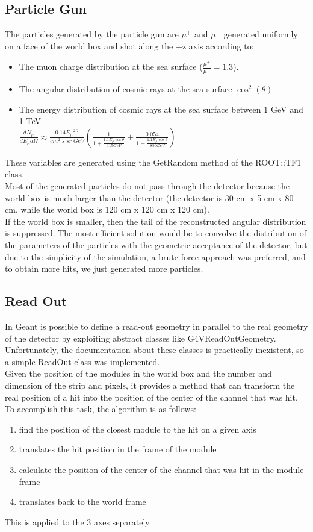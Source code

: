 \documentclass[10pt, a4paper, twocolumn]{article} %
\begin{document}
\subsection{Particle Gun}
\label{ssec:PG}
The particles generated by the particle gun are $\mu^+$ and $\mu^-$ generated uniformly on a face of the world box and shot along the +z axis according to:
\begin{itemize} 
    \item The muon charge distribution at the sea surface ($\frac{\mu^+}{\mu^-}=1.3$).
    \item The angular distribution of cosmic rays at the sea surface $\cos^2(\theta)$
    \item The energy distribution of cosmic rays at the sea surface between 1 GeV and 1 TeV
    \\
    $ \frac{dN_{\mu}}{dE_{\mu} d \Omega} \approx \frac{0.14 E_{\mu}^{-2.7}}{cm^2 \; s \;sr \; GeV} \left( \frac{1}{1+\frac{1.1 E_{\mu}\cos{\theta}}{115 GeV}} + \frac{0.054}{1+\frac{1.1 E_{\mu}\cos{\theta}}{850 GeV}} \right) $
\end{itemize}
These variables are generated using the GetRandom method of the ROOT::TF1 class.
\\
Most of the generated particles do not pass through the detector because the world box is much larger than the detector (the detector is 30 cm x 5 cm x 80 cm, while the world box is 120 cm x 120 cm x 120 cm).
\\
If the world box is smaller, then the tail of the reconstructed angular distribution is suppressed.
The most efficient solution would be to convolve the distribution of the parameters of the particles with the geometric acceptance of the detector, but due to the simplicity of the simulation, a brute force approach was preferred, and to obtain more hits, we just generated more particles.
\subsection{Read Out}
In Geant is possible to define a read-out geometry in parallel to the real geometry of the detector by exploiting abstract classes like G4VReadOutGeometry. Unfortunately, the documentation about these classes is practically inexistent, so a simple ReadOut class was implemented.
\\
Given the position of the modules in the world box and the number and dimension of the strip and pixels, it provides a method that can transform the real position of a hit into the position of the center of the channel that was hit.
\\
To accomplish this task, the algorithm is as follows:
\begin{enumerate}
    \item find the position of the closest module to the hit on a given axis
    \item translates the hit position in the frame of the module
    \item calculate the position of the center of the channel that was hit in the module frame
    \item translates back to the world frame
\end{enumerate}
This is applied to the 3 axes separately.
\end{document}
